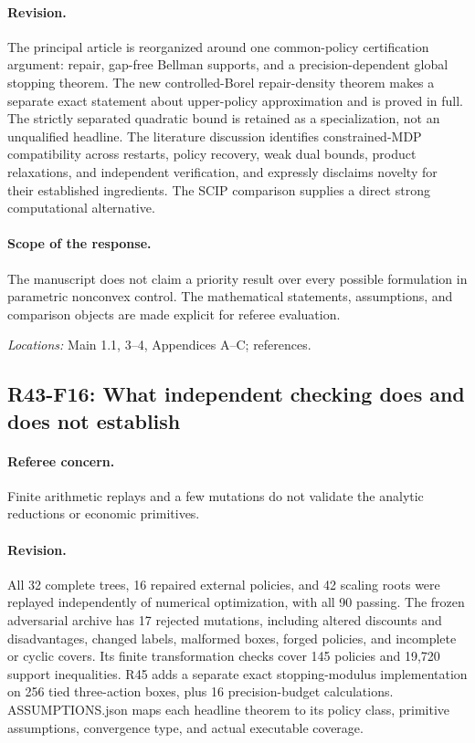\paragraph*{Revision.} The principal article is reorganized around one common-policy certification argument: repair, gap-free Bellman supports, and a precision-dependent global stopping theorem. The new controlled-Borel repair-density theorem makes a separate exact statement about upper-policy approximation and is proved in full. The strictly separated quadratic bound is retained as a specialization, not an unqualified headline. The literature discussion identifies constrained-MDP compatibility across restarts, policy recovery, weak dual bounds, product relaxations, and independent verification, and expressly disclaims novelty for their established ingredients. The SCIP comparison supplies a direct strong computational alternative.

\paragraph*{Scope of the response.} The manuscript does not claim a priority result over every possible formulation in parametric nonconvex control. The mathematical statements, assumptions, and comparison objects are made explicit for referee evaluation.

\noindent\textit{Locations:} Main 1.1, 3--4, Appendices A--C; references.

\subsection{R43-F16: What independent checking does and does not establish}
\paragraph*{Referee concern.} Finite arithmetic replays and a few mutations do not validate the analytic reductions or economic primitives.

\paragraph*{Revision.} All 32 complete trees, 16 repaired external policies, and 42 scaling roots were replayed independently of numerical optimization, with all 90 passing. The frozen adversarial archive has 17 rejected mutations, including altered discounts and disadvantages, changed labels, malformed boxes, forged policies, and incomplete or cyclic covers. Its finite transformation checks cover 145 policies and 19,720 support inequalities. R45 adds a separate exact stopping-modulus implementation on 256 tied three-action boxes, plus 16 precision-budget calculations. ASSUMPTIONS.json maps each headline theorem to its policy class, primitive assumptions, convergence type, and actual executable coverage.

